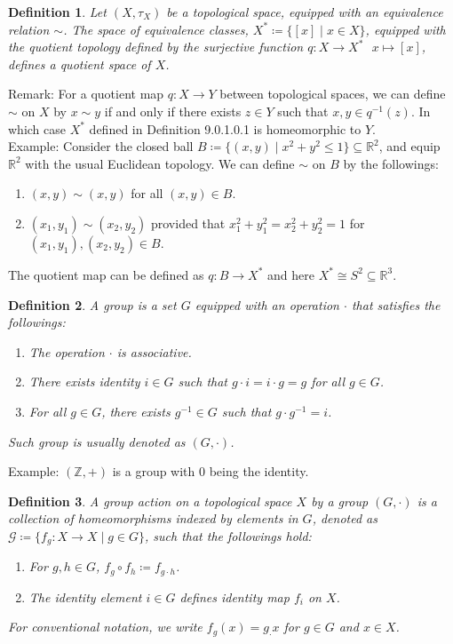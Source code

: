 \documentclass[11pt]{book}
\theoremstyle{break}
\theoremstyle{break}
\newtheorem{defn}{Definition}[corL]
\newcommand{\R}{\mathbb{R}}
\newcommand{\Z}{\mathbb{Z}}
\newcommand{\remark}{\color{blue}Remark: \color{black}}
\newcommand{\example}{\color{green}Example: \color{black}}
\begin{document}
\begin{defn}
Let $(X,\tau_X)$ be a topological space, equipped with an equivalence relation $\sim$. The space of equivalence classes, $X^*\coloneqq \{[x]\mid x\in X\}$, equipped with the quotient topology defined by the surjective function $q:X \to X^* \ \ \ x\mapsto [x]$, defines a quotient space of $X$.
\end{defn}
\remark For a quotient map $q:X \to Y$ between topological spaces, we can define $\sim$ on $X$ by $x\sim y$ if and only if there exists $z \in Y$ such that $x,y \in q^{-1}(z)$. In which case $X^*$ defined in Definition 9.0.1.0.1 is homeomorphic to $Y$. \\

\example Consider the closed ball $B\coloneqq\{(x,y) \mid x^2 + y^2 \leq 1\} \subseteq \R^2$, and equip $\R^2$ with the usual Euclidean topology. We can define $\sim$ on $B$ by the followings:
\begin{enumerate}[topsep=3pt,itemsep=-1ex,partopsep=1ex,parsep=1ex]
\item $(x,y) \sim (x,y)$ for all $(x,y) \in B$. 
\item $(x_1,y_1) \sim (x_2,y_2)$ provided that $x_1^2 + y_1^2 = x_2^2 + y_2^2 = 1$ for $(x_1,y_1),(x_2,y_2) \in B$. 
\end{enumerate}
The quotient map can be defined as $q:B \to X^*$ and here $X^*\cong S^2 \subseteq \R^3$.


\begin{defn}
A group is a set $G$ equipped with an operation $\cdot$ that satisfies the followings:
\begin{enumerate}[topsep=3pt,itemsep=-1ex,partopsep=1ex,parsep=1ex]
\item The operation $\cdot$ is associative.
\item There exists identity $i \in G$ such that $g\cdot i  = i\cdot g = g$ for all $g \in G$.
\item For all $g\in G$, there exists $g^{-1} \in G$ such that $g\cdot g^{-1} = i$.
\end{enumerate}
Such group is usually denoted as $(G,\cdot)$.
\end{defn}


\example $(\Z,+)$ is a group with $0$ being the identity.\\

\begin{defn}
A group action on a topological space $X$ by a group $(G,\cdot)$ is a collection of homeomorphisms indexed by elements in $G$, denoted as $\mathcal{G} \coloneqq \{f_g : X\to X\mid g \in G\}$, such that the followings hold: 
\begin{enumerate}[topsep=3pt,itemsep=-1ex,partopsep=1ex,parsep=1ex]
\item For $g,h\in G$, $f_g\circ f_h \coloneqq f_{g\cdot h}$.
\item The identity element $i \in G$ defines identity map $f_i$ on $X$. 
\end{enumerate}  
For conventional notation, we write $f_g(x) = g_\cdot x$ for $g\in G$ and $x \in X$.
\end{defn}
\end{document}
